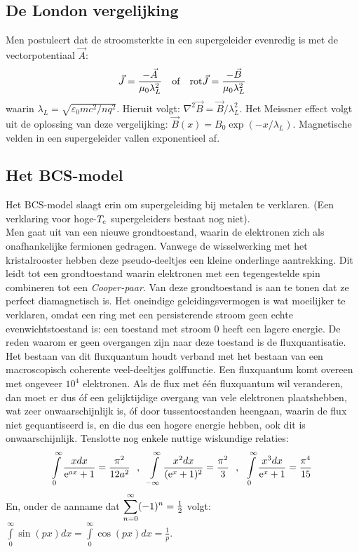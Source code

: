 \subsection{De London vergelijking}
Men postuleert dat de stroomsterkte in een supergeleider evenredig is met de
vectorpotentiaal $\vec{A}$:
\[
\vec{J}=\frac{-\vec{A}}{\mu_0\lambda_L^2}~~~\mbox{of}~~~
{\rm rot}\vec{J}=\frac{-\vec{B}}{\mu_0\lambda_L^2}
\]
waarin $\lambda_L=\sqrt{\varepsilon_0mc^2/nq^2}$. Hieruit volgt:
$\nabla^2\vec{B}=\vec{B}/\lambda_L^2$.
\npar
Het Meissner effect volgt uit de oplossing van deze vergelijking:
$\vec{B}(x)=B_0\exp(-x/\lambda_L)$. Magnetische velden in een supergeleider
vallen exponentieel af.

\subsection{Het BCS-model}
Het BCS-model slaagt erin om supergeleiding bij metalen te verklaren. (Een
verklaring voor hoge-$T_{\rm c}$ supergeleiders bestaat nog niet).\\
Men gaat uit van een nieuwe grondtoestand, waarin de elektronen zich als
onafhankelijke fermionen gedragen. Vanwege de wisselwerking met het
kristalrooster hebben deze pseudo-deeltjes een kleine onderlinge aantrekking.
Dit leidt tot een grondtoestand waarin elektronen met een tegengestelde
spin combineren tot een {\it Cooper-paar}. Van deze grondtoestand is aan te
tonen dat ze perfect diamagnetisch is.
\npar
Het oneindige geleidingsvermogen is wat moeilijker te verklaren, omdat een
ring met een persisterende stroom geen echte evenwichtstoestand is: een
toestand met stroom 0 heeft een lagere energie. De reden waarom er geen
overgangen zijn naar deze toestand is de fluxquantisatie. Het bestaan van dit
fluxquantum houdt verband met het bestaan van een macroscopisch coherente
veel-deeltjes golffunctie. Een fluxquantum komt overeen met ongeveer $10^4$
elektronen. Als de flux met \'e\'en fluxquantum wil veranderen, dan moet er
dus \'of een gelijktijdige overgang van vele elektronen plaatshebben, wat
zeer onwaarschijnlijk is, \'of door tussentoestanden heengaan, waarin de flux
niet gequantiseerd is, en die dus een hogere energie hebben, ook dit is
onwaarschijnlijk.
\npar
Tenslotte nog enkele nuttige wiskundige relaties:
\[
\int\limits_0^\infty\frac{xdx}{{\rm e}^{ax}+1}=\frac{\pi^2}{12a^2}~~,~~
\int\limits_{-\infty}^\infty\frac{x^2dx}{({\rm e}^x+1)^2}=\frac{\pi^2}{3}~~,~~
\int\limits_0^\infty\frac{x^3dx}{{\rm e}^x+1}=\frac{\pi^4}{15}
\]
En, onder de aanname dat $\displaystyle \sum_{n=0}^\infty(-1)^n=\mbox{$\frac{1}{2}$}$ volgt:
$\displaystyle\int\limits_0^\infty\sin(px)dx=\int\limits_0^\infty\cos(px)dx=\frac{1}{p}$.

